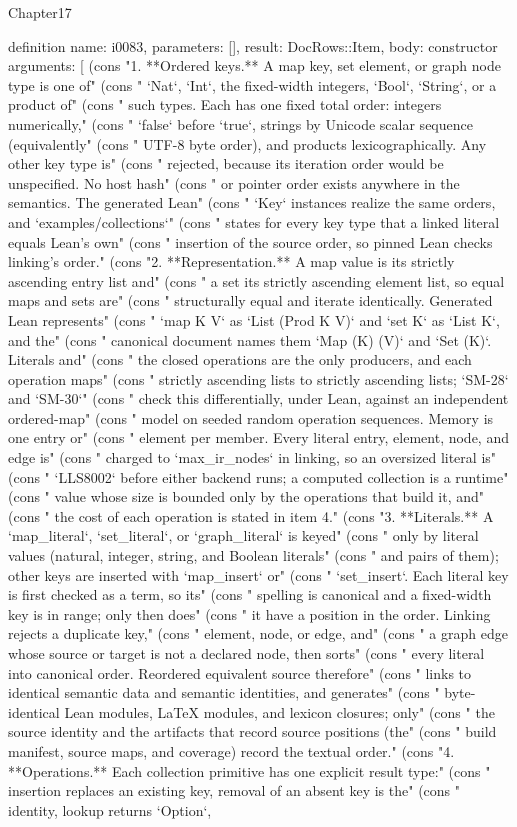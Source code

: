 \begin{lexlean}{Chapter17}
\begin{semanticmodule}
definition{
  name: i0083,
  parameters: [],
  result: DocRows::Item,
  body: constructor{
    arguments: [
      (cons "1. **Ordered keys.** A map key, set element, or graph node type is one of" (cons "   `Nat`, `Int`, the fixed-width integers, `Bool`, `String`, or a product of" (cons "   such types. Each has one fixed total order: integers numerically," (cons "   `false` before `true`, strings by Unicode scalar sequence (equivalently" (cons "   UTF-8 byte order), and products lexicographically. Any other key type is" (cons "   rejected, because its iteration order would be unspecified. No host hash" (cons "   or pointer order exists anywhere in the semantics. The generated Lean" (cons "   `Key` instances realize the same orders, and `examples/collections`" (cons "   states for every key type that a linked literal equals Lean's own" (cons "   insertion of the source order, so pinned Lean checks linking's order." (cons "2. **Representation.** A map value is its strictly ascending entry list and" (cons "   a set its strictly ascending element list, so equal maps and sets are" (cons "   structurally equal and iterate identically. Generated Lean represents" (cons "   `map K V` as `List (Prod K V)` and `set K` as `List K`, and the" (cons "   canonical document names them `Map (K) (V)` and `Set (K)`. Literals and" (cons "   the closed operations are the only producers, and each operation maps" (cons "   strictly ascending lists to strictly ascending lists; `SM-28` and `SM-30`" (cons "   check this differentially, under Lean, against an independent ordered-map" (cons "   model on seeded random operation sequences. Memory is one entry or" (cons "   element per member. Every literal entry, element, node, and edge is" (cons "   charged to `max_ir_nodes` in linking, so an oversized literal is" (cons "   `LLS8002` before either backend runs; a computed collection is a runtime" (cons "   value whose size is bounded only by the operations that build it, and" (cons "   the cost of each operation is stated in item 4." (cons "3. **Literals.** A `map_literal`, `set_literal`, or `graph_literal` is keyed" (cons "   only by literal values (natural, integer, string, and Boolean literals" (cons "   and pairs of them); other keys are inserted with `map_insert` or" (cons "   `set_insert`. Each literal key is first checked as a term, so its" (cons "   spelling is canonical and a fixed-width key is in range; only then does" (cons "   it have a position in the order. Linking rejects a duplicate key," (cons "   element, node, or edge, and" (cons "   a graph edge whose source or target is not a declared node, then sorts" (cons "   every literal into canonical order. Reordered equivalent source therefore" (cons "   links to identical semantic data and semantic identities, and generates" (cons "   byte-identical Lean modules, LaTeX modules, and lexicon closures; only" (cons "   the source identity and the artifacts that record source positions (the" (cons "   build manifest, source maps, and coverage) record the textual order." (cons "4. **Operations.** Each collection primitive has one explicit result type:" (cons "   insertion replaces an existing key, removal of an absent key is the" (cons "   identity, lookup returns `Option`, }}
\end{semanticmodule}
\end{lexlean}
